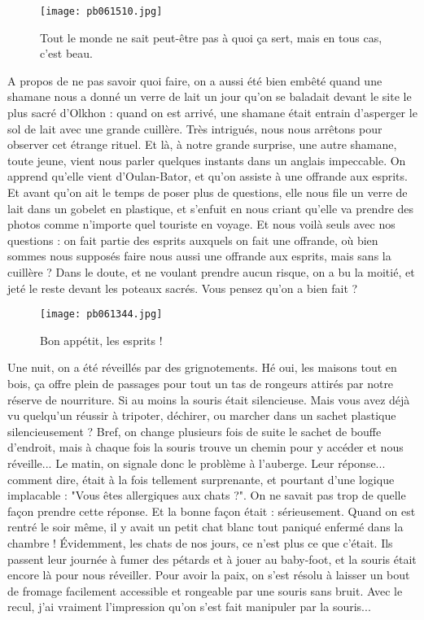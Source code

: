 \documentclass{book}
\begin{document}
\begin{figure}[h]
\centering
\texttt{[image: pb061510.jpg]}
\caption*{ Tout le monde ne sait peut-être pas à quoi ça sert, mais en tous cas, c'est beau.}
\end{figure}

A propos de ne pas savoir quoi faire, on a aussi été bien embêté quand une shamane nous a donné un verre de lait un jour qu'on se baladait devant le site le plus sacré d'Olkhon : quand on est arrivé, une shamane était entrain d'asperger le sol de lait avec une grande cuillère. Très intrigués, nous nous arrêtons pour observer cet étrange rituel. Et là, à notre grande surprise, une autre shamane, toute jeune, vient nous parler quelques instants dans un anglais impeccable. On apprend qu'elle vient d'Oulan-Bator, et qu'on assiste à une offrande aux esprits. Et avant qu'on ait le temps de poser plus de questions, elle nous file un verre de lait dans un gobelet en plastique, et s'enfuit en nous criant qu'elle va prendre des photos comme n'importe quel touriste en voyage. Et nous voilà seuls avec nos questions : on fait partie des esprits auxquels on fait une offrande, où bien sommes nous supposés faire nous aussi une offrande aux esprits, mais sans la cuillère ? Dans le doute, et ne voulant prendre aucun risque, on a bu la moitié, et jeté le reste devant les poteaux sacrés. Vous pensez qu'on a bien fait ?


\begin{figure}[h]
\centering
\texttt{[image: pb061344.jpg]}
\caption*{ Bon appétit, les esprits !}
\end{figure}

Une nuit, on a été réveillés par des grignotements. Hé oui, les maisons tout en bois, ça offre plein de passages pour tout un tas de rongeurs attirés par notre réserve de nourriture. Si au moins la souris était silencieuse. Mais vous avez déjà vu quelqu'un réussir à tripoter, déchirer, ou marcher dans un sachet plastique silencieusement ? Bref, on change plusieurs fois de suite le sachet de bouffe d'endroit, mais à chaque fois la souris trouve un chemin pour y accéder et nous réveille... Le matin, on signale donc le problème à l'auberge. Leur réponse... comment dire, était à la fois tellement surprenante, et pourtant d'une logique implacable : "Vous êtes allergiques aux chats ?". On ne savait pas trop de quelle façon prendre cette réponse. Et la bonne façon était : sérieusement. Quand on est rentré le soir même, il y avait un petit chat blanc tout paniqué enfermé dans la chambre ! Évidemment, les chats de nos jours, ce n'est plus ce que c'était. Ils passent leur journée à fumer des pétards et à jouer au baby-foot, et la souris était encore là pour nous réveiller. Pour avoir la paix, on s'est résolu à laisser un bout de fromage facilement accessible et rongeable par une souris sans bruit. Avec le recul, j'ai vraiment l'impression qu'on s'est fait manipuler par la souris...
\end{document}
